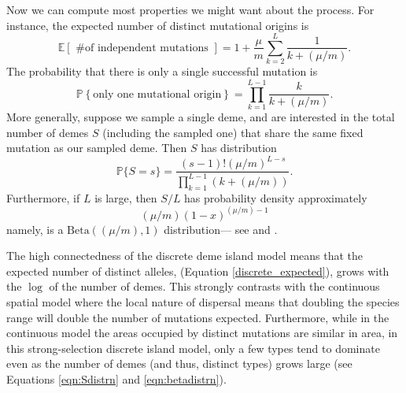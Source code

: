 \documentclass{article}
\renewcommand{\P}{\mathbb{P}}
\newcommand{\E}{\mathbb{E}}
\begin{document}
Now we can compute most properties we might want about the process.
For instance, the expected number of distinct mutational origins is
\begin{equation}
    \E\left[ \mbox{ \# of independent mutations } \right] = 
            1 + \frac{\mu}{m} \sum_{k=2}^L \frac{1}{k+(\mu/m)}. \label{discrete_expected}
\end{equation}
The probability that there is only a single successful mutation is
\begin{equation}
\P \left\{ \mbox{only one mutational origin} \right\} = 
            \prod_{k=1}^{L-1} \frac{ k }{ k+(\mu/m)} .
\end{equation}
More generally, suppose we sample a single deme, and are interested in the total number of demes $S$
(including the sampled one) that share the same fixed mutation as our sampled deme.
Then $S$ has distribution
\begin{equation} \label{eqn:Sdistrn}
\P\{ S=s \} = \frac{ (s-1)! (\mu/m)^{L-s} }{ \prod_{k=1}^{L-1} (k+(\mu/m)) } .
\end{equation}
Furthermore, if $L$ is large, then $S/L$ has probability density approximately
\begin{equation} \label{eqn:betadistrn}
   (\mu/m) (1-x)^{(\mu/m)-1}
\end{equation}
namely, is a $\mathrm{Beta}((\mu/m), 1)$ distribution--- see \cite{donnelly1989continuity} and \cite{perman1992sizebiased}.


The high connectedness of the discrete deme island model means that the expected number of distinct alleles, (Equation \eqref{discrete_expected}), 
grows with the $\log$ of the number of demes. This strongly contrasts with the continuous spatial model where the local nature of dispersal means that doubling the species range will double the number of mutations expected. 
Furthermore, while in the continuous model the areas occupied by distinct mutations are similar in area, in this strong-selection discrete island model, 
only a few types tend to dominate even as the number of demes (and thus, distinct types) grows large (see Equations \eqref{eqn:Sdistrn} and \eqref{eqn:betadistrn}).
\end{document}
